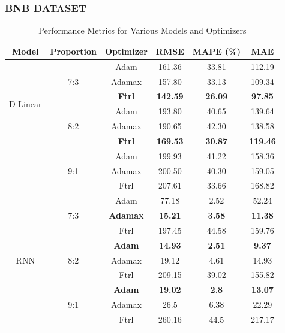 \documentclass{ieeeojies}
\begin{document}
\subsubsection{BNB DATASET}
\begin{table}[H]
    \centering
    \caption{Performance Metrics for Various Models and Optimizers}
    \begin{tabular}{|c|c|c|c|c|c|}
        \hline
        \rowcolor{ao(english)}
        Model & Proportion & Optimizer & RMSE & MAPE (\%) & MAE \\ \hline
        
        \multirow{6}{*}{D-Linear} & \multirow{3}{*}{7:3} & Adam & 161.36 & 33.81 & 112.19 \\ \cline{3-6}
         &  & Adamax & 157.80 & 33.13 & 109.34 \\ \cline{3-6}
         &  & \textbf{Ftrl} & \textbf{142.59} & \textbf{26.09} & \textbf{97.85} \\ \cline{2-6}
         & \multirow{3}{*}{8:2} & Adam & 193.80 & 40.65 & 139.64 \\ \cline{3-6}
         &  & Adamax & 190.65 & 42.30 & 138.58 \\ \cline{3-6}
         &  & \textbf{Ftrl} & \textbf{169.53} & \textbf{30.87} & \textbf{119.46} \\ \cline{2-6}
         & \multirow{3}{*}{9:1} & Adam & 199.93 & 41.22 & 158.36 \\ \cline{3-6}
         &  & Adamax & 200.50 & 40.30 & 159.05 \\ \cline{3-6}
         &  & Ftrl & 207.61 & 33.66 & 168.82 \\ \hline

        \multirow{9}{*}{RNN} & \multirow{3}{*}{7:3} & Adam & 77.18 & 2.52 & 52.24 \\ \cline{3-6}
         &  & \textbf{Adamax} & \textbf{15.21} & \textbf{3.58} & \textbf{11.38} \\ \cline{3-6}
         &  & Ftrl & 197.45 & 44.58 & 159.76 \\ \cline{2-6}
         & \multirow{3}{*}{8:2} & \textbf{Adam} & \textbf{14.93} & \textbf{2.51} & \textbf{9.37} \\ \cline{3-6}
         &  & Adamax & 19.12 & 4.61 & 14.93 \\ \cline{3-6}
         &  & Ftrl & 209.15 & 39.02 & 155.82 \\ \cline{2-6}
         & \multirow{3}{*}{9:1} & \textbf{Adam} & \textbf{19.02} & \textbf{2.8} & \textbf{13.07} \\ \cline{3-6}
         &  & Adamax & 26.5 & 6.38 & 22.29 \\ \cline{3-6}
         &  & Ftrl & 260.16 & 44.5 & 217.17 \\ \hline


\end{tabular}
\end{table}
\end{document}
